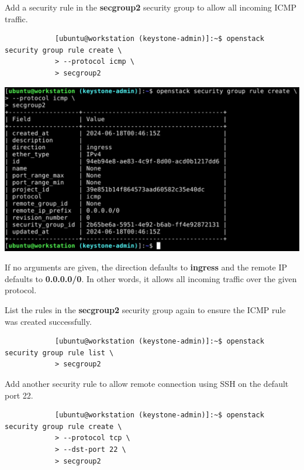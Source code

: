 \documentclass[letterpaper, 12pt]{article}
\begin{document}
\begin{enumerate}
    \begin{labstep}
        Add a security rule in the \textbf{secgroup2} security group to allow all incoming ICMP traffic.
        \begin{lstlisting}
            [ubuntu@workstation (keystone-admin)]:~$ openstack security group rule create \
            > --protocol icmp \
            > secgroup2
        \end{lstlisting}

        \begin{center}
            \includegraphics[width=\linewidth]{images/part5/step14.png}
        \end{center}
    \end{labstep}

    \begin{notebox}
        If no arguments are given, the direction defaults to \textbf{ingress} and the remote IP defaults to \textbf{0.0.0.0/0}.
        In other words, it allows all incoming traffic over the given protocol.
    \end{notebox}

    \begin{labstep}
        List the rules in the \textbf{secgroup2} security group again to ensure the ICMP rule was created successfully.
        \begin{lstlisting}
            [ubuntu@workstation (keystone-admin)]:~$ openstack security group rule list \
            > secgroup2
        \end{lstlisting}
    \end{labstep}

    \begin{labstep}
        Add another security rule to allow remote connection using SSH on the default port 22.
        \begin{lstlisting}
            [ubuntu@workstation (keystone-admin)]:~$ openstack security group rule create \
            > --protocol tcp \
            > --dst-port 22 \
            > secgroup2
        \end{lstlisting}


\end{labstep}
\end{enumerate}
\end{document}
